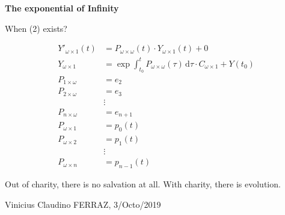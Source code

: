 \documentclass[12pt]{article}
\begin{document}
\Large

\begin{center}
\textbf{The exponential of Infinity}
\end{center}

\normalsize

When (2) exists?

\begin{align}
  Y'_{\omega \times 1}(t) &= P_{\omega \times \omega}(t) \cdot Y_{\omega \times 1}(t) + 0 \\
  Y_{\omega \times 1} &= \exp \int_{t_0}^t P_{\omega \times \omega}(\tau)\,\mathrm{d}\tau \cdot C_{\omega \times 1} + Y(t_0) \\
  P_{1 \times \omega} &= e_2 \\
  P_{2 \times \omega} &= e_3 \\
  &\vdots \\
  P_{n \times \omega} &= e_{n + 1} \\
  P_{\omega \times 1} &= p_0(t) \\
  P_{\omega \times 2} &= p_1(t) \\
  &\vdots \\
  P_{\omega \times n} &= p_{n-1}(t)
\end{align}

\vspace{3mm}

Out of charity, there is no salvation at all. With charity, there is evolution.

\vspace{3mm}

Vinicius Claudino FERRAZ, 3/Octo/2019
\end{document}
